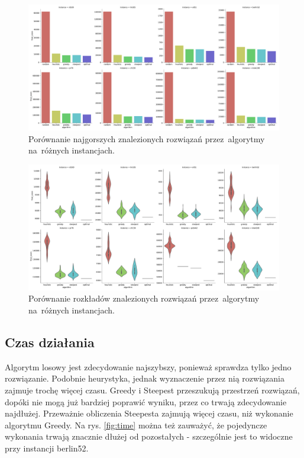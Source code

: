 \begin{figure}
\begin{center}
\includegraphics[width=1.0\textwidth]{graphs/score_comparison_bar_max.pdf}
\end{center}
\caption{Porównanie najgorszych znalezionych rozwiązań przez~algorytmy na~różnych instancjach.}
\label{fig:worst}
\end{figure}

\begin{figure}
\begin{center}
\includegraphics[width=1.0\textwidth]{graphs/score_comparison_violin.pdf}
\end{center}
\caption{Porównanie rozkładów znalezionych rozwiązań przez~algorytmy na~różnych instancjach.}
\label{fig:distribution}
\end{figure}

\subsection{Czas działania}

Algorytm losowy jest zdecydowanie najszybszy, ponieważ sprawdza tylko jedno rozwiązanie. Podobnie heurystyka, jednak wyznaczenie przez nią rozwiązania zajmuje trochę więcej czasu. Greedy i Steepest przeszukują przestrzeń rozwiązań, dopóki nie mogą już bardziej poprawić wyniku, przez co trwają zdecydowanie najdłużej. Przeważnie obliczenia Steepesta zajmują więcej czasu, niż wykonanie algorytmu Greedy. Na rys. \ref{fig:time} można też zauważyć, że pojedyncze wykonania trwają znacznie dłużej od pozostałych - szczególnie jest to widoczne przy instancji berlin52.


